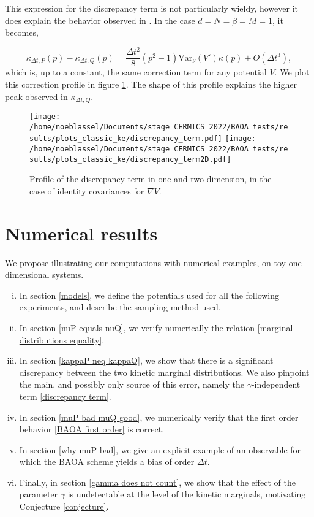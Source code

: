 \begin{remark}\label{remark}
  This expression for the discrepancy term is not particularly wieldy, however it does explain the behavior observed in \cite{KK22}. In the case $d=N=\beta=M=1$, it becomes,

  $$\kappa_{\Delta t,P}(p)- \kappa_{\Delta t,Q}(p)=\frac{\Delta t^2}8(p^2-1)\mathrm{Var}_\nu(V')\kappa(p)+O(\Delta t^3),$$
  which is, up to a constant, the same correction term for any potential $V$. We plot this correction profile in figure \ref{fig:discrepancy_term}. The shape of this profile explains the higher peak observed in $\kappa_{\Delta t,Q}$.
\end{remark}

\begin{figure}[htbp]
  \begin{center}
    \texttt{[image: /home/noeblassel/Documents/stage\_CERMICS\_2022/BAOA\_tests/results/plots\_classic\_ke/discrepancy\_term.pdf]}
    \texttt{[image: /home/noeblassel/Documents/stage\_CERMICS\_2022/BAOA\_tests/results/plots\_classic\_ke/discrepancy\_term2D.pdf]}
    \caption{ \label{fig:discrepancy_term}
      Profile of the discrepancy term in one and two dimension, in the case of identity covariances for $\nabla V$.
    }
  \end{center}
\end{figure}

\section{Numerical results}
We propose illustrating our computations with numerical examples, on toy one dimensional systems.
\begin{enumerate}[(i)]
  \item In section \ref{models}, we define the potentials used for all the following experiments, and describe the sampling method used.
  \item In section \ref{nuP equals nuQ}, we verify numerically the relation \eqref{marginal distributions equality}.
  \item In section \ref{kappaP neq kappaQ}, we show that there is a significant discrepancy between the two kinetic marginal distributions. We also pinpoint the main, and possibly only source of this error, namely the $\gamma$-independent term \eqref{discrepancy term}.
  \item In section \ref{muP bad muQ good}, we numerically verify that the first order behavior \eqref{BAOA first order} is correct.
  \item In section \ref{why muP bad}, we give an explicit example of an observable for which the BAOA scheme yields a bias of order $\Delta t$.
  \item Finally, in section \ref{gamma does not count}, we show that the effect of the parameter $\gamma$ is undetectable at the level of the kinetic marginals, motivating Conjecture \ref{conjecture}.
\end{enumerate}


